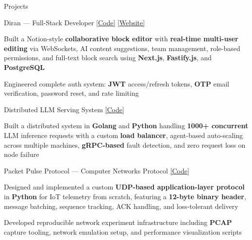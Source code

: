 \begin{rSection}{Projects}
  
  
\resumeProjectEntry
	{Diran --- Full-Stack Developer}
	{\href{https://github.com/sherqo/diran}{[Code]} \href{https://diran.app/}{[Website]}}
	{
\item Built a Notion-style \textbf{collaborative block editor} with \textbf{real-time multi-user editing} via WebSockets, AI content suggestions, team management, role-based permissions, and full-text block search using \textbf{Next.js}, \textbf{Fastify.js}, and \textbf{PostgreSQL}
\item Engineered complete auth system: \textbf{JWT} access/refresh tokens, \textbf{OTP} email verification, password reset, and rate limiting
	}
  
\resumeProjectEntry
	{Distributed LLM Serving System}
	{\href{https://github.com/sherqo/llm-cluster-orchestrator}{[Code]}}
	{
\item Built a distributed system in \textbf{Golang} and \textbf{Python} handling \textbf{1000+ concurrent} LLM inference requests with a custom \textbf{load balancer}, agent-based auto-scaling across multiple machines, \textbf{gRPC-based} fault detection, and zero request loss on node failure
	}

  
\resumeProjectEntry
	{Packet Pulse Protocol --- Computer Networks Protocol}
	{\href{https://github.com/sherqo/packet-pulse-protocol}{[Code]}}
	{
\item Designed and implemented a custom \textbf{UDP-based application-layer protocol} in \textbf{Python} for IoT telemetry from scratch, featuring a \textbf{12-byte binary header}, message batching, sequence tracking, ACK handling, and loss-tolerant delivery
\item Developed reproducible network experiment infrastructure including \textbf{PCAP} capture tooling, network emulation setup, and performance visualization scripts
	}
\end{rSection}